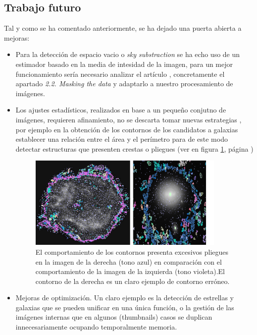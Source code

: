 	\subsection{Trabajo futuro}
	\label{sec:futureWork}
	Tal y como se ha comentado anteriormente, se ha dejado una puerta abierta a mejoras:
	\begin{itemize} 
	\item Para la detección de espacio vacio o \textit{sky substraction} se ha echo uso de un estimador basado en la media de intesidad de la imagen, para un mejor funcionamiento sería necesario analizar el artículo \cite{BlantonSubstraction}, concretamente el apartado \textit{2.2. Masking the data} y adaptarlo a nuestro procesamiento de imágenes.
	\item Los ajustes estadísticos, realizados en base a un pequeño conjutno de imágenes, requieren afinamiento, no se descarta tomar nuevas estrategias \cite{SSDImgPro}, por ejemplo en la obtención de los contornos de los candidatos a galaxias establecer una relación entre el área y el perímetro para de este modo detectar estructuras que presenten crestas o pliegues (ver en figura \ref{fig:MembraneNebulae}, página \pageref{fig:MembraneNebulae})
		\begin{figure}[!htb]
			\centering
			\includegraphics[width=0.9\textwidth]{images/nebulaMembrana2.jpg}
			\caption{\label{fig:MembraneNebulae}{\small El comportamiento de los contornos presenta excesivos pliegues en la imagen de la derecha (tono azul) en comparación con el comportamiento de la imagen de la izquierda (tono violeta).El contorno de la derecha es un claro ejemplo de contorno erróneo.}}
		\end{figure}
	\item Mejoras de optimización. Un claro ejemplo es la detección de estrellas y galaxias que se pueden unificar en una única función, o la gestión de las imágenes internas que en algunos (thumbnails) casos se duplican innecesariamente ocupando temporalmente memoria.

\end{itemize}

